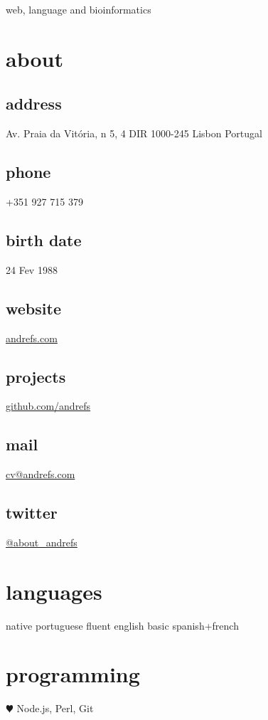 \documentclass[a4paper]{friggeri-cv}
\begin{document}
       {web, language and bioinformatics}



\begin{aside}
  \section{about}
\begin{sensitive}
    \subsection{address}
    Av. Praia da Vitória,
    n 5, 4 DIR
    1000-245 Lisbon
    Portugal
    \subsection{phone}
    +351 927 715 379
    \subsection{birth date}
    24 Fev 1988
\end{sensitive}
    \subsection{website}
    \url{andrefs.com}
    \subsection{projects}
    \url{github.com/andrefs}
    \subsection{mail}
    \href{mailto:cv@andrefs.com}{cv@andrefs.com}
    \subsection{twitter}
    \href{http://witter.com/about_andrefs}{@about\_andrefs}
  \section{languages}
    native portuguese
    fluent english
    basic spanish+french
  \section{programming}
    {$\varheartsuit$} Node.js, Perl, Git
\end{aside}
\end{document}
